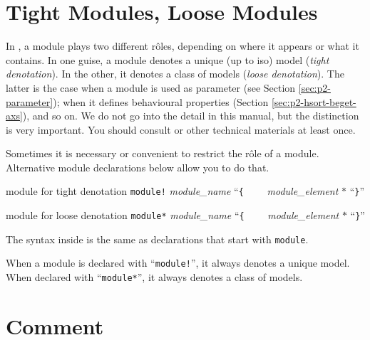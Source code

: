 \documentclass[a4paper]{memoir}
\begin{document}
\section{Tight Modules, Loose Modules}\label{sec:p2-obj-th}

In \cafeobj, a module plays two different r{\^ o}les, depending on where it
appears or what it contains. In one guise, a module denotes a unique
(up to iso) model ({\em tight denotation}).
In the other, it denotes a class of models ({\em loose denotation}).
 The latter is the case when
a module is used as parameter (see Section \ref{sec:p2-parameter});
when it defines behavioural properties (Section \ref{sec:p2-hsort-beget-axs}),
and so on. We do not go into the detail in this manual, but the distinction
is very important. You should consult \cite{cafeobj-rep} or other
technical materials at least once.

Sometimes it is necessary or convenient to restrict the r{\^ o}le of
a module. Alternative module declarations below allow you to do that.

\begin{bsyntax} module for tight denotation \Hline
\texttt{module!} \textit{module\_name} ``\texttt{\{}
~~~~\textit{module\_element} $*$
``\texttt{\}}''
\end{bsyntax}

\begin{bsyntax} module for loose denotation \Hline
\texttt{module*} \textit{module\_name} ``\texttt{\{}
~~~~\textit{module\_element} $*$
``\texttt{\}}''
\end{bsyntax}

The syntax inside is the same as declarations that start
with \verb|module|.

When a module is declared with ``\verb|module!|'', it always denotes a
unique model. When declared with ``\verb|module*|'', it always denotes a
class of models.


\section{Comment}\label{sec:p2-comment-syntax}
\end{document}
